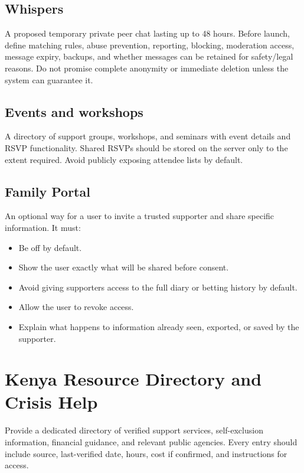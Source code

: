 \documentclass[11pt,a4paper]{article}
\begin{document}
\subsection{Whispers}
A proposed temporary private peer chat lasting up to 48 hours. Before launch, define matching rules, abuse prevention, reporting, blocking, moderation access, message expiry, backups, and whether messages can be retained for safety/legal reasons. Do not promise complete anonymity or immediate deletion unless the system can guarantee it.

\subsection{Events and workshops}
A directory of support groups, workshops, and seminars with event details and RSVP functionality. Shared RSVPs should be stored on the server only to the extent required. Avoid publicly exposing attendee lists by default.

\subsection{Family Portal}
An optional way for a user to invite a trusted supporter and share specific information. It must:
\begin{itemize}
  \item Be off by default.
  \item Show the user exactly what will be shared before consent.
  \item Avoid giving supporters access to the full diary or betting history by default.
  \item Allow the user to revoke access.
  \item Explain what happens to information already seen, exported, or saved by the supporter.
\end{itemize}

\section{Kenya Resource Directory and Crisis Help}

Provide a dedicated directory of verified support services, self-exclusion information, financial guidance, and relevant public agencies. Every entry should include source, last-verified date, hours, cost if confirmed, and instructions for access.
\end{document}
